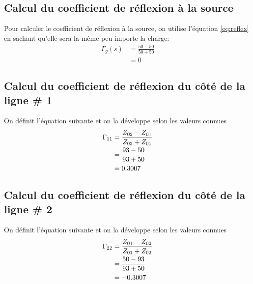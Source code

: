 \begin{figure}[htb]
\end{figure}
\newpage
\subsection{Calcul du coefficient de réflexion à la source}
Pour calculer le coefficient de réflexion à la source, on utilise l'équation \ref{eq:reflex} en sachant qu'elle sera la même peu importe la charge:
\begin{align*}
\Gamma_g (s) &= \frac{50 - 50}{50 + 50}\\
&= 0
\end{align*}
\subsection{Calcul du coefficient de réflexion du côté de la ligne \# 1}
On définit l'équation suivante et on la développe selon les valeurs connues
\begin{align}
\Gamma_{11} &= \frac{Z_{02} - Z_{01}}{Z_{02} + Z_{01}}\\
			&= \frac{93-50}{93 + 50}\notag\\
			&= 0.3007\notag
\end{align}
\subsection{Calcul du coefficient de réflexion du côté de la ligne \# 2}
On définit l'équation suivante et on la développe selon les valeurs connues
\begin{align}
\Gamma_{22} &= \frac{Z_{01} - Z_{02}}{Z_{01} + Z_{02}}\\
			&= \frac{50-93}{93 + 50}\notag\\
			&= -0.3007\notag
\end{align}
